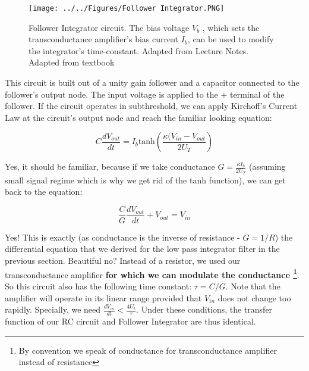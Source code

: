 \begin{figure}[H]
    \centering
    \texttt{[image: ../../Figures/Follower Integrator.PNG]}
    \caption{Follower Integrator circuit. The bias voltage $V_b$ , which sets the transconductance amplifier’s bias current $I_b$, can be used to modify the integrator’s time-constant. Adapted from Lecture Notes. Adapted from textbook}
    \label{fig:Follower_Integrator}
\end{figure}

This circuit is built out of a unity gain follower and a capacitor connected to the follower's output node. The input voltage is applied to the $+$ terminal of the follower. If the circuit operates in subthreshold, we can apply Kirchoff's Current Law at the circuit's output node and reach the familiar looking equation: 

\begin{equation}
    C \frac{dV_{out}}{dt} = I_b \mathrm{tanh}(\frac{\kappa (V_{in} - V_{out}}{2 U_T})
\end{equation}

Yes, it should be familiar, because if we take conductance $G = \frac{\kappa I_b}{2 U_T}$ (assuming small signal regime which is why we get rid of the tanh function), we can get back to the equation: 

\begin{equation}
    \frac{C}{G} \frac{dV_{out}}{dt} + V_{out} = V_{in}
\end{equation}

Yes! This is exactly (as conductance is the inverse of resistance - $G = 1/R$) the differential equation that we derived for the low pass integrator filter in the previous section. Beautiful no? Instead of a resistor, we used our transconductance amplifier \textbf{for which we can modulate the conductance \footnote{By convention we speak of conductance for transconductance amplifier instead of resistance}}. So this circuit also has the following time constant: $\tau = C/G$. Note that the amplifier will operate in its linear range provided that $V_{in}$ does not change
too rapidly. Specially, we need $\frac{dV_{in}}{dt} < \frac{4U_t}{\tau}$. Under these conditions, the transfer function of our RC circuit and Follower Integrator are thus identical. 

